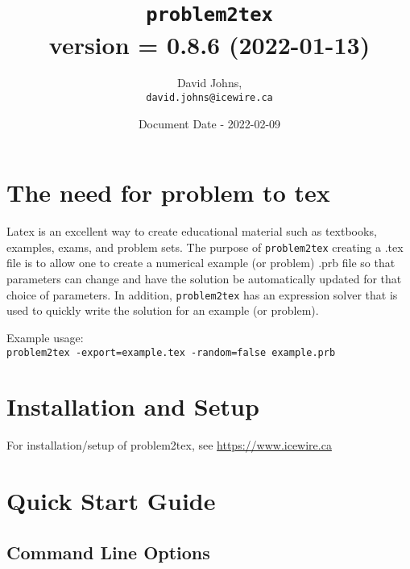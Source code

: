 \documentclass{article}
\title{\color{blue}\texttt{problem2tex} \\ \normalsize{version = 0.8.6 (2022-01-13)}}
\author{
David Johns, \\ \texttt{david.johns@icewire.ca}
}
\date{Document Date - 2022-02-09}
\begin{document}
\maketitle
\tableofcontents

\section{The need for problem to tex}


Latex is an excellent way to create educational material such as textbooks, examples, exams, and problem sets.  The purpose of \texttt{problem2tex} creating a .tex file is to allow one to create a numerical example (or problem) .prb file so that parameters can change and have the solution be automatically updated for that choice of parameters.  In addition, \texttt{problem2tex} has an expression solver that is used to quickly write the solution for an example (or problem).  

Example usage:\\
\texttt{problem2tex -export=example.tex -random=false example.prb}

\section{Installation and Setup}

For installation/setup of problem2tex, see \href{https://www.icewire.ca}{https://www.icewire.ca}




\section{Quick Start Guide}

\subsection{Command Line Options}
\end{document}
